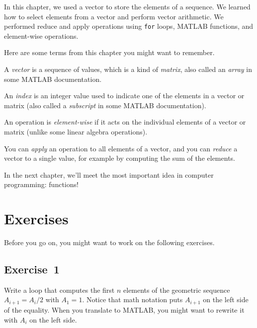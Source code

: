 In this chapter, we used a vector to store the elements of a sequence.  We learned how to select elements from a vector and perform vector arithmetic.  We performed reduce and apply operations using \lstinline{for} loops, MATLAB functions, and element-wise operations.

Here are some terms from this chapter you might want to remember.


A \emph{vector} is a sequence of values, which is a kind of \emph{matrix}, also called an \emph{array} in some MATLAB documentation.

An \emph{index} is an integer value used to indicate one of the elements
in a vector or matrix (also called a \emph{subscript} in some MATLAB documentation).

An operation is \emph{element-wise} if it acts on the individual elements of a vector or matrix (unlike some linear algebra operations).

You can \emph{apply} an operation to all elements of a vector, and you can \mbox{\emph{reduce}} a vector to a single value, for example by computing the sum of the elements.


In the next chapter, we'll meet the most important idea in computer programming: functions!



\section{Exercises}

Before you go on, you might want to work on the following exercises.

\subsection{Exercise~1}
Write a loop that computes the first $n$ elements
of the geometric sequence $A_{i+1} = A_i/2$ with $A_1 = 1$.  Notice that
math notation puts $A_{i+1}$ on the left side of the equality.
When you translate to MATLAB, you might want to rewrite it with
$A_{i}$ on the left side.


